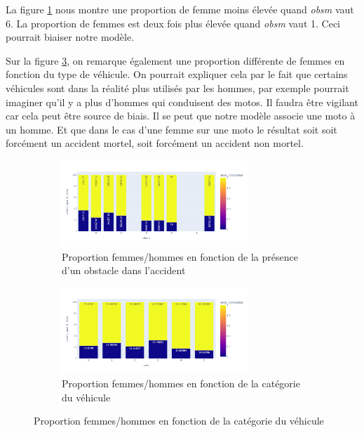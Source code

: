 \documentclass{article}
\begin{document}
    La figure \ref{fig:fig_sexe_bivar1} nous montre une proportion de femme moins élevée quand \textit{obsm} vaut 
    6. La proportion de femmes est deux fois plus élevée quand \textit{obsm} vaut 1. Ceci pourrait biaiser notre 
    modèle.
    
    Sur la figure \ref{fig:fig_sexe_bivar2}, on remarque également une proportion différente de femmes 
    en fonction du type de véhicule. On pourrait expliquer cela par le fait que certains véhicules sont 
    dans la réalité plus utilisés par les hommes, par exemple pourrait imaginer qu'il y a plus d'hommes qui 
    conduisent des motos. Il faudra être vigilant car cela peut être source de biais. Il se peut que notre 
    modèle associe une moto à un homme. Et que dans le cas d'une femme sur une moto le résultat soit soit 
    forcément un accident mortel, soit forcément un accident non mortel.

    \begin{figure}[h]
        \centering
        \begin{subfigure}{7cm}
            \includegraphics[width=7cm]{./img/bivar_sexe.png}
            \caption{Proportion femmes/hommes en fonction de la présence d'un obstacle dans l'accident}
            \label{fig:fig_sexe_bivar1}
        \end{subfigure}
        \hspace{0.2cm}
        \begin{subfigure}{7cm}
            \includegraphics[width=7cm]{./img/bivar_sexe2.png}
        \caption{Proportion femmes/hommes en fonction de la catégorie du véhicule}
        \label{fig:fig_sexe_bivar2}
        \end{subfigure}
    \end{figure}
    \vspace{2cm}
\end{document}
